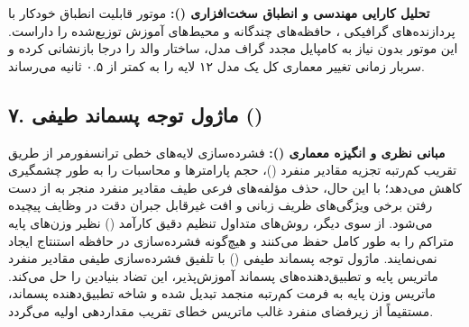 \textbf{تحلیل کارایی مهندسی و انطباق سخت‌افزاری ():}
موتور  قابلیت انطباق خودکار با پردازنده‌های گرافیکی ، حافظه‌های چندگانه و محیط‌های آموزش توزیع‌شده را داراست. این موتور بدون نیاز به کامپایل مجدد گراف مدل، ساختار والد را درجا بازنشانی کرده و سربار زمانی تغییر معماری کل یک مدل ۱۲ لایه را به کمتر از ۰.۵ ثانیه می‌رساند.



\subsection*{۷. ماژول توجه پسماند طیفی  ()}

\textbf{مبانی نظری و انگیزه معماری ():}
فشرده‌سازی لایه‌های خطی ترانسفورمر از طریق تقریب کم‌رتبه تجزیه مقادیر منفرد ()، حجم پارامترها و محاسبات را به طور چشمگیری کاهش می‌دهد؛ با این حال، حذف مؤلفه‌های فرعی طیف مقادیر منفرد منجر به از دست رفتن برخی ویژگی‌های ظریف زبانی و افت غیرقابل جبران دقت در وظایف پیچیده می‌شود. از سوی دیگر، روش‌های متداول تنظیم دقیق کارآمد () نظیر  وزن‌های پایه متراکم را به طور کامل حفظ می‌کنند و هیچ‌گونه فشرده‌سازی در حافظه استنتاج ایجاد نمی‌نمایند.
ماژول توجه پسماند طیفی () با تلفیق فشرده‌سازی طیفی مقادیر منفرد ماتریس پایه و تطبیق‌دهنده‌های پسماند آموزش‌پذیر، این تضاد بنیادین را حل می‌کند. ماتریس وزن پایه به فرمت کم‌رتبه منجمد تبدیل شده و شاخه تطبیق‌دهنده پسماند، مستقیماً از زیرفضای منفرد غالب ماتریس خطای تقریب مقداردهی اولیه می‌گردد.

